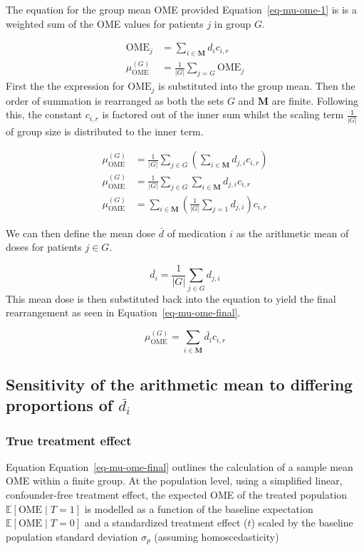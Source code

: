 \documentclass[
  letterpaper,
  DIV=11,
  numbers=noendperiod]{scrreprt}
\begin{document}
The equation for the group mean OME provided Equation~\ref{eq-mu-ome-1}
is is a weighted sum of the OME values for patients \(j\) in group
\(G\).

\[
\begin{align}
\text{OME}_j &= \sum_{i\in\mathbf{M}} d_i c_{i,r} \\
\mu_{\text{OME}}^{(G)} &= \frac{1}{|G|} \sum_{j=G} \text{OME}_j
\end{align}
\] First the the expression for \(\text{OME}_j\) is substituted into the
group mean. Then the order of summation is rearranged as both the sets
\(G\) and \(\mathbf{M}\) are finite. Following this, the constant
\(c_{i,r}\) is factored out of the inner sum whilst the scaling term
\(\frac{1}{|G|}\) of group size is distributed to the inner term.

\[
\begin{align}
\mu_{\text{OME}}^{(G)} &= \frac{1}{|G|} \sum_{j \in G}  \left( \sum_{i\in\mathbf{M}} d_{j,i} c_{i,r} \right) \\
\mu_{\text{OME}}^{(G)} &= \frac{1}{|G|} \sum_{j \in G}  \sum_{i\in\mathbf{M}} d_{j,i} c_{i,r} \\
\mu_{\text{OME}}^{(G)} &= \sum_{i\in\mathbf{M}} \left( \frac{1}{|G|} \sum_{j=1}  d_{j,i}  \right) c_{i,r}
\end{align}
\]

We can then define the mean dose \(\bar{d}\) of medication \(i\) as the
arithmetic mean of doses for patients \(j \in G\).

\[
\bar{d_i} = \frac{1}{|G|} \sum_{j \in G} d_{j,i}
\] This mean dose is then substituted back into the equation to yield
the final rearrangement as seen in Equation~\ref{eq-mu-ome-final}.

\[
\mu_{\text{OME}}^{(G)}  = \sum_{i\in\mathbf{M}} \bar{d_{i}} c_{i,r} 
\]

\subsection{\texorpdfstring{Sensitivity of the arithmetic mean to
differing proportions of
\(\bar{d_i}\)}{Sensitivity of the arithmetic mean to differing proportions of \textbackslash bar\{d\_i\}}}\label{sec-ome-difference-proof}

\subsubsection{True treatment effect}\label{true-treatment-effect}

Equation Equation~\ref{eq-mu-ome-final} outlines the calculation of a
sample mean OME within a finite group. At the population level, using a
simplified linear, confounder-free treatment effect, the expected OME of
the treated population \(\mathbb{E}[\text{OME} \mid T = 1]\) is modelled
as a function of the baseline expectation
\(\mathbb{E}[\text{OME} \mid T = 0]\) and a standardized treatment
effect (\(t\)) scaled by the baseline population standard deviation
\(\sigma_p\) (assuming homoscedasticity)
\end{document}
